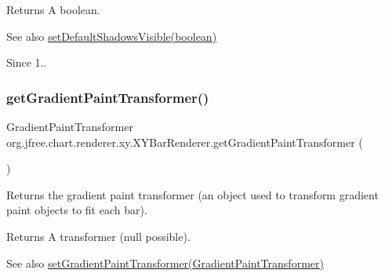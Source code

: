 \begin{DoxyReturn}{Returns}
A boolean.
\end{DoxyReturn}
\begin{DoxySeeAlso}{See also}
\mbox{\hyperlink{classorg_1_1jfree_1_1chart_1_1renderer_1_1xy_1_1_x_y_bar_renderer_a664b110e52c74b44011d370d3e5f6b1a}{set\+Default\+Shadows\+Visible(boolean)}}
\end{DoxySeeAlso}
\begin{DoxySince}{Since}
1.. 
\end{DoxySince}
\mbox{\label{classorg_1_1jfree_1_1chart_1_1renderer_1_1xy_1_1_x_y_bar_renderer_a7ecf5c18565098bb2f49783e5606cf4e}} 
\subsubsection{\texorpdfstring{get\+Gradient\+Paint\+Transformer()}{getGradientPaintTransformer()}}
{\footnotesize\ttfamily Gradient\+Paint\+Transformer org.\+jfree.\+chart.\+renderer.\+xy.\+X\+Y\+Bar\+Renderer.\+get\+Gradient\+Paint\+Transformer (\begin{DoxyParamCaption}{ }\end{DoxyParamCaption})}

Returns the gradient paint transformer (an object used to transform gradient paint objects to fit each bar).

\begin{DoxyReturn}{Returns}
A transformer ({\ttfamily null} possible).
\end{DoxyReturn}
\begin{DoxySeeAlso}{See also}
\mbox{\hyperlink{classorg_1_1jfree_1_1chart_1_1renderer_1_1xy_1_1_x_y_bar_renderer_aa367f21104094dede9def889bcfd2940}{set\+Gradient\+Paint\+Transformer(\+Gradient\+Paint\+Transformer)}} 
\end{DoxySeeAlso}
\mbox{\label{classorg_1_1jfree_1_1chart_1_1renderer_1_1xy_1_1_x_y_bar_renderer_a15d92923759411abc18db2dceb623ee8}} 
